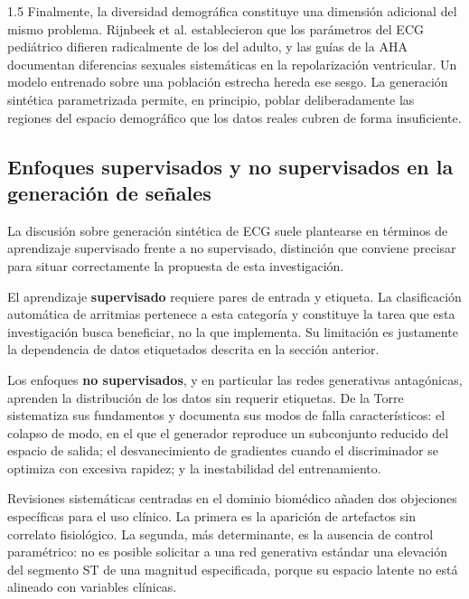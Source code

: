 \begin{spacing}{1.5}
Finalmente, la diversidad demográfica constituye una dimensión adicional del mismo problema. Rijnbeek et al. \cite{rijnbeek2001normal} establecieron que los parámetros del ECG pediátrico difieren radicalmente de los del adulto, y las guías de la AHA \cite{rautaharju2009aha} documentan diferencias sexuales sistemáticas en la repolarización ventricular. Un modelo entrenado sobre una población estrecha hereda ese sesgo. La generación sintética parametrizada permite, en principio, poblar deliberadamente las regiones del espacio demográfico que los datos reales cubren de forma insuficiente.

\subsection{Enfoques supervisados y no supervisados en la generación de señales}

La discusión sobre generación sintética de ECG suele plantearse en términos de aprendizaje supervisado frente a no supervisado, distinción que conviene precisar para situar correctamente la propuesta de esta investigación.

El aprendizaje \textbf{supervisado} requiere pares de entrada y etiqueta. La clasificación automática de arritmias pertenece a esta categoría y constituye la tarea que esta investigación busca beneficiar, no la que implementa. Su limitación es justamente la dependencia de datos etiquetados descrita en la sección anterior.

Los enfoques \textbf{no supervisados}, y en particular las redes generativas antagónicas, aprenden la distribución de los datos sin requerir etiquetas. De la Torre \cite{delatorre2023gan} sistematiza sus fundamentos y documenta sus modos de falla característicos: el colapso de modo, en el que el generador reproduce un subconjunto reducido del espacio de salida; el desvanecimiento de gradientes cuando el discriminador se optimiza con excesiva rapidez; y la inestabilidad del entrenamiento.

Revisiones sistemáticas centradas en el dominio biomédico \cite{brophy2023generative, wulan2020generating} añaden dos objeciones específicas para el uso clínico. La primera es la aparición de artefactos sin correlato fisiológico. La segunda, más determinante, es la ausencia de control paramétrico: no es posible solicitar a una red generativa estándar una elevación del segmento ST de una magnitud especificada, porque su espacio latente no está alineado con variables clínicas.


\end{spacing}
